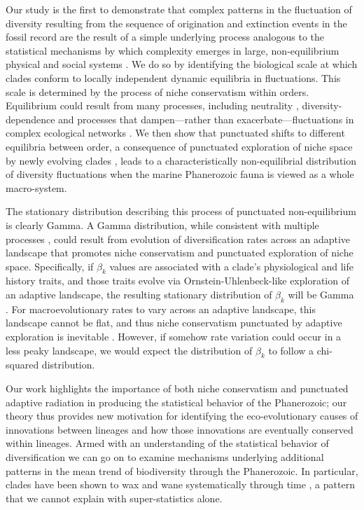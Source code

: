 \documentclass[12pt]{article}
\let\citep=\autocite
\begin{document}
Our study is the first to demonstrate that complex patterns in the
fluctuation of diversity resulting from the sequence of origination
and extinction events in the fossil record are the result of a simple
underlying process analogous to the statistical mechanisms by which
complexity emerges in large, non-equilibrium physical \citep{beck2004}
and social systems \citep{fuentes2009}.  We do so by identifying the
biological scale at which clades conform to locally independent
dynamic equilibria in fluctuations. This scale is determined by the
process of niche conservatism \citep{roy2009range, hopkins2014} within
orders.  Equilibrium could result from many processes, including
neutrality \citep{macWilson, hubbell2001}, diversity-dependence
\citep{gavrilets2005, rabosky2009ecolLett} and processes that
dampen---rather than exacerbate---fluctuations in complex ecological
networks \citep{berlow2009}. We then show that punctuated shifts to
different equilibria between order, a consequence of punctuated
exploration of niche space by newly evolving clades
\citep{eldredgeGould1972, newman1985adaptive, hopkins2014}, leads to a
characteristically non-equilibrial distribution of diversity
fluctuations when the marine Phanerozoic fauna is viewed as a whole
macro-system.

The stationary distribution describing this process of punctuated
non-equilibrium is clearly Gamma.  A Gamma distribution, while
consistent with multiple processes \citep[e.g.][]{cir1985}, could
result from evolution of diversification rates across an adaptive
landscape that promotes niche conservatism and punctuated exploration
of niche space.  Specifically, if $\beta_k$ values are associated with
a clade's physiological and life history traits, and those traits
evolve via Ornstein-Uhlenbeck-like exploration of an adaptive
landscape, the resulting stationary distribution of $\beta_k$ will be
Gamma \citep{cir1985, butler2004}.  For macroevolutionary rates to
vary across an adaptive landscape, this landscape cannot be flat, and
thus niche conservatism punctuated by adaptive exploration is
inevitable \citep{newman1985adaptive}. However, if somehow rate
variation could occur in a less peaky landscape, we would expect the
distribution of $\beta_k$ to follow a chi-squared distribution.

Our work highlights the importance of both niche conservatism and
punctuated adaptive radiation in producing the statistical behavior of
the Phanerozoic; our theory thus provides new motivation for
identifying the eco-evolutionary causes of innovations between
lineages and how those innovations are eventually conserved within
lineages. Armed with an understanding of the statistical behavior of
diversification we can go on to examine mechanisms underlying
additional patterns in the mean trend of biodiversity through the
Phanerozoic. In particular, clades have been shown to wax and wane
systematically through time \citep{liow2007,
  quental2013}, a pattern that we cannot explain with super-statistics
alone.
\end{document}
